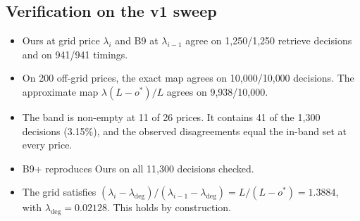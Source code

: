 \subsection{Verification on the v1 sweep}
\begin{itemize}
\item Ours at grid price $\lambda_i$ and B9 at $\lambda_{i-1}$ agree on
1{,}250/1{,}250 retrieve decisions and on 941/941 timings.
\item On 200 off-grid prices, the exact map agrees on 10{,}000/10{,}000 decisions.
The approximate map $\lambda(L-o^{*})/L$ agrees on 9{,}938/10{,}000.
\item The band is non-empty at 11 of 26 prices. It contains 41 of the 1{,}300
decisions (3.15\%), and the observed disagreements equal the in-band set at
every price.
\item B9+ reproduces Ours on all 11{,}300 decisions checked.
\item The grid satisfies
$(\lambda_i-\lambda_{\deg})/(\lambda_{i-1}-\lambda_{\deg})=L/(L-o^{*})=1.3884$,
with $\lambda_{\deg}=0.02128$. This holds by construction.
\end{itemize}
